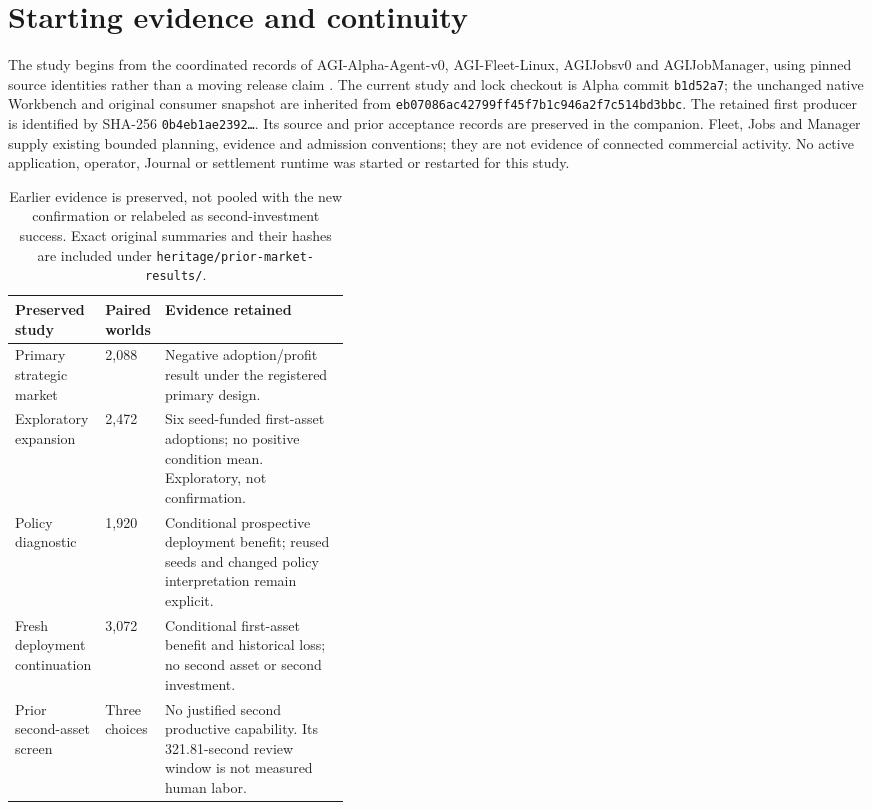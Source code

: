 \documentclass[11pt,letterpaper]{article}
\DeclareRobustCommand{\artifact}[1]{\texttt{#1}}
\begin{document}
\section{Starting evidence and continuity}

The study begins from the coordinated records of AGI-Alpha-Agent-v0, AGI-Fleet-Linux, AGIJobsv0 and AGIJobManager, using pinned source identities rather than a moving release claim \cite{coordination,prior}. The current study and lock checkout is Alpha commit \texttt{b1d52a7}; the unchanged native Workbench and original consumer snapshot are inherited from \texttt{eb07086ac42799ff45f7b1c946a2f7c514bd3bbc}. The retained first producer is identified by SHA-256 \texttt{0b4eb1ae2392\ldots}. Its source and prior acceptance records are preserved in the companion. Fleet, Jobs and Manager supply existing bounded planning, evidence and admission conventions; they are not evidence of connected commercial activity. No active application, operator, Journal or settlement runtime was started or restarted for this study.

\begin{table}[htbp]
\centering\small
\begin{tabularx}{\linewidth}{@{}p{0.23\linewidth}p{0.16\linewidth}Y@{}}
\toprule
Preserved study & Paired worlds & Evidence retained \\
\midrule
Primary strategic market & 2,088 & Negative adoption/profit result under the registered primary design. \\
Exploratory expansion & 2,472 & Six seed-funded first-asset adoptions; no positive condition mean. Exploratory, not confirmation. \\
Policy diagnostic & 1,920 & Conditional prospective deployment benefit; reused seeds and changed policy interpretation remain explicit. \\
Fresh deployment continuation & 3,072 & Conditional first-asset benefit and historical loss; no second asset or second investment. \\
Prior second-asset screen & Three choices & No justified second productive capability. Its 321.81-second review window is not measured human labor. \\
\bottomrule
\end{tabularx}
\caption{Earlier evidence is preserved, not pooled with the new confirmation or relabeled as second-investment success. Exact original summaries and their hashes are included under \artifact{heritage/prior-market-results/}.}
\end{table}
\end{document}
